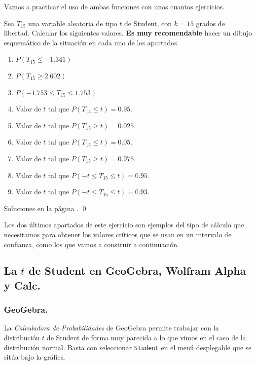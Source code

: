 \documentclass[10pt,a4paper]{article}\usepackage[]{graphicx}\usepackage[]{color}
\newcounter {cont01}
\begin{document}
Vamos a practicar el uso de ambas funciones con unos cuantos ejercicios.

\begin{ejercicio}
\label{tut06:ejercicio09}
Sea $T_{15}$ una variable aleatoria de tipo $t$ de Student, con $k=15$ grados de libertad. Calcular los siguientes valores. {\bf Es muy recomendable} hacer un dibujo esquemático de la situación en cada uno de los apartados.
    \begin{enumerate}
        \item $P(T_{15}\leq -1.341)$
        \item $P(T_{15}\geq 2.602)$
        \item $P(-1.753\leq T_{15}\leq 1.753)$
        \item Valor de $t$ tal que $P(T_{15}\leq t)=0.95$.
        \item Valor de $t$ tal que $P(T_{15}\geq t)=0.025$.
        \item Valor de $t$ tal que $P(T_{15}\leq t)=0.05$.
        \item Valor de $t$ tal que $P(T_{15}\geq t)=0.975$.
        \item Valor de $t$ tal que $P(-t\leq T_{15}\leq t)=0.95$.
        \item Valor de $t$ tal que $P(-t\leq T_{15}\leq t)=0.93$.
    \end{enumerate}
Soluciones en la página \pageref{tut06:ejercicio09:sol}.
\qed
\end{ejercicio}
Los dos últimos apartados de este ejercicio son ejemplos del tipo de cálculo que necesitamos para obtener los valores críticos que se usan en un intervalo de confianza, como los que vamos a construir a continuación.

\subsection{La $t$ de Student en GeoGebra, Wolfram Alpha y Calc.}
\label{tut06:subsec:tStudentConR}

\subsubsection{GeoGebra.}

La {\em Calculadora de Probabilidades} de GeoGebra permite trabajar con la distribución $t$ de Student de forma muy parecida a lo que vimos en el caso de la distribución normal. Basta con seleccionar {\tt Student} en el menú desplegable que se sitúa bajo la gráfica.
\end{document}
